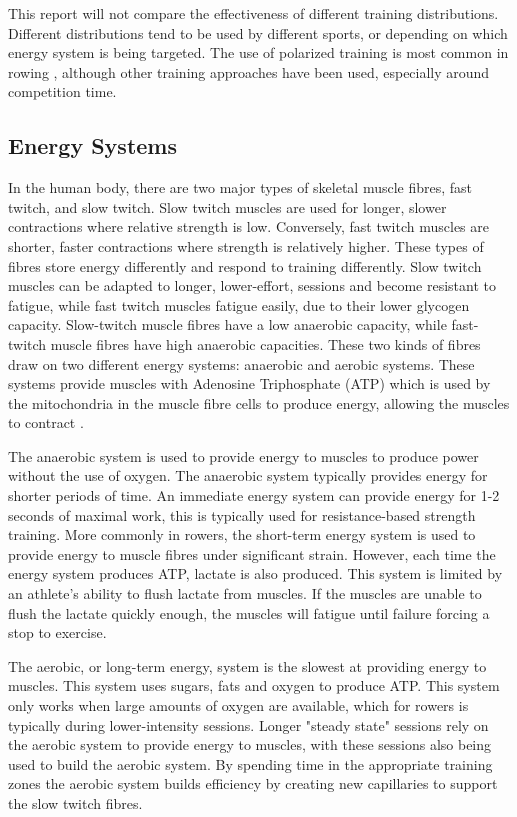 This report will not compare the effectiveness of different training distributions. Different distributions tend to be used by different sports, or depending on which energy system is being targeted. The use of polarized training is most common in rowing \autocite{Rosenblat2019}, although other training approaches have been used, especially around competition time.


\subsection{Energy Systems}
\label{sub:energy_systems}
In the human body, there are two major types of skeletal muscle fibres, fast twitch, and slow twitch. Slow twitch muscles are used for longer, slower contractions where relative strength is low. Conversely, fast twitch muscles are shorter, faster contractions where strength is relatively higher. These types of fibres store energy differently and respond to training differently. Slow twitch muscles can be adapted to longer, lower-effort, sessions and become resistant to fatigue, while fast twitch muscles fatigue easily, due to their lower glycogen capacity. Slow-twitch muscle fibres have a low anaerobic capacity, while fast-twitch muscle fibres have high anaerobic capacities. These two kinds of fibres draw on two different energy systems: anaerobic and aerobic systems. These systems provide muscles with Adenosine Triphosphate (ATP) which is used by the mitochondria in the muscle fibre cells to produce energy, allowing the muscles to contract \cite{Göktepe2007}. 

The anaerobic system is used to provide energy to muscles to produce power without the use of oxygen. The anaerobic system typically provides energy for shorter periods of time. An immediate energy system can provide energy for 1-2 seconds of maximal work, this is typically used for resistance-based strength training. More commonly in rowers, the short-term energy system is used to provide energy to muscle fibres under significant strain. However, each time the energy system produces ATP, lactate is also produced. This system is limited by an athlete's ability to flush lactate from muscles. If the muscles are unable to flush the lactate quickly enough, the muscles will fatigue until failure forcing a stop to exercise. 

The aerobic, or long-term energy, system is the slowest at providing energy to muscles. This system uses sugars, fats and oxygen to produce ATP. This system only works when large amounts of oxygen are available, which for rowers is typically during lower-intensity sessions. Longer "steady state" sessions rely on the aerobic system to provide energy to muscles, with these sessions also being used to build the aerobic system. By spending time in the appropriate training zones the aerobic system builds efficiency by creating new capillaries to support the slow twitch fibres.

